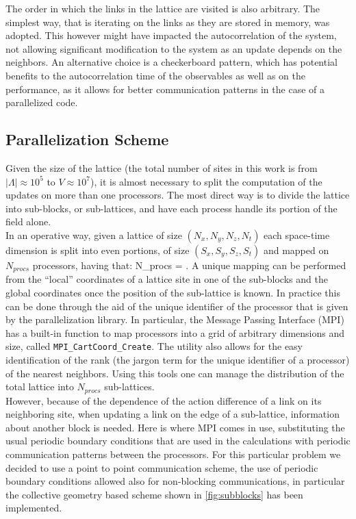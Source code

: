 The order in which the links in the lattice are visited is also arbitrary. The simplest way, that is iterating on the links as they are stored in memory, was adopted. This however might have impacted the autocorrelation of the system, not allowing significant modification to the system as an update depends on the neighbors. An alternative choice is a checkerboard pattern, which has potential benefits to the autocorrelation time of the observables as well as on the performance, as it allows for better communication patterns in the case of a parallelized code. 

\subsection{Parallelization Scheme}
\label{sec:para_gen}
Given the size of the lattice (the total number of sites in this work is from $|\Lambda| \approx 10^5$ to $V\approx 10^7$), it is almost necessary to split the computation of the updates on more than one processors. The most direct way is to divide the lattice into sub-blocks, or sub-lattices, and have each process handle its portion of the field alone. \\
In an operative way, given a lattice of size $(N_x, N_y, N_z, N_t)$ each space-time dimension is split into even portions, of size $(S_x, S_y, S_z, S_t)$ and mapped on $N_{procs}$ processors, having that:
\beq
N_{procs} =  \times {} \times {}  \times {}.
\eeq 
A unique mapping can be performed from the ``local'' coordinates of a lattice site in one of the sub-blocks and the global coordinates once the position of the sub-lattice is known. In practice this can be done through the aid of the unique identifier of the processor that is given by the parallelization library. In particular, the Message Passing Interface (MPI) has a built-in function to map processors into a grid of arbitrary dimensions and size, called \texttt{MPI\_CartCoord\_Create}. The utility also allows for the easy identification of the rank (the jargon term for the unique identifier of a processor) of the nearest neighbors. Using this tools one can manage the distribution of the total lattice into $N_{procs}$ sub-lattices. \\
However, because of the dependence of the action difference of a link on its neighboring site, when updating a link on the edge of a sub-lattice, information about another block is needed. Here is where MPI comes in use, substituting the usual periodic boundary conditions that are used in the calculations with periodic communication patterns between the processors. For this particular problem we decided to use a point to point communication scheme, the use of periodic boundary conditions allowed also for non-blocking communications, in particular the collective geometry based scheme shown in \cref{fig:subblocks} has been implemented. 

